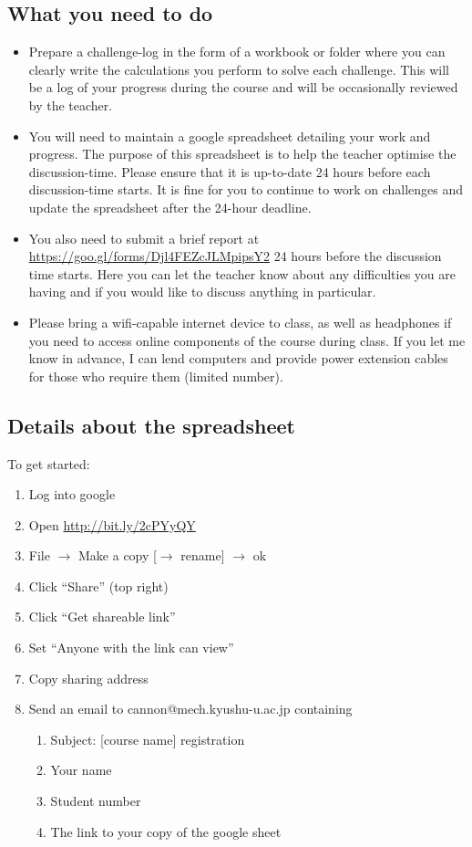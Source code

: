 \subsection{What you need to do}
\begin{itemize}
    \item Prepare a challenge-log in the form of a workbook or folder where you can clearly write the calculations you perform to solve each challenge. This will be a log of your progress during the course and will be occasionally reviewed by the teacher.
    \item You will need to maintain a google spreadsheet detailing your work and progress. The purpose of this spreadsheet is to help the teacher optimise the discussion-time. Please ensure that it is up-to-date 24 hours before each discussion-time starts. It is fine for you to continue to work on challenges and update the spreadsheet after the 24-hour deadline.
    \item You also need to submit a brief report at \url{https://goo.gl/forms/Djl4FEZcJLMpipsY2} 24 hours before the discussion time starts. Here you can let the teacher know about any difficulties you are having and if you would like to discuss anything in particular.
    \item Please bring a wifi-capable internet device to class, as well as headphones if you need to access online components of the course during class. If you let me know in advance, I can lend computers and provide power extension cables for those who require them (limited number).
\end{itemize}

\subsection{Details about the spreadsheet}
To get started:
\begin{enumerate}
    \item Log into google
    \item Open \url{http://bit.ly/2cPYyQY}
    \item File $\rightarrow$ Make a copy [$\rightarrow$ rename] $\rightarrow$ ok
    \item Click ``Share'' (top right)
    \item Click ``Get shareable link''
    \item Set ``Anyone with the link can view''
    \item Copy sharing address
    \item Send an email to cannon@mech.kyushu-u.ac.jp containing
    \begin{enumerate}
       \item Subject: [course name] registration
       \item Your name
       \item Student number
       \item The link to your copy of the google sheet
    \end{enumerate}
\end{enumerate}

